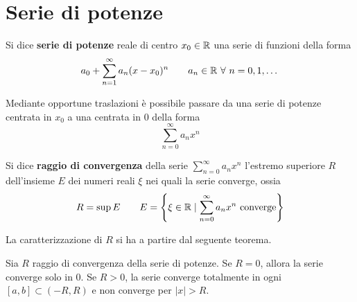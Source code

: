 \section{Serie di potenze}
\begin{definition}
Si dice \textbf{serie di potenze} reale di centro $x_0 \in \mathbb{R}$ una serie di funzioni della forma
\begin{equation*}
    a_0+ \sum_{n=1}^{\infty}{a_n(x-x_0)^n} \qquad a_n \in \R\ \forall\ n=0,1,\dots
\end{equation*}
\end{definition}
\begin{oss}
    Mediante opportune traslazioni è possibile passare da una serie di potenze centrata in $x_0$ a una centrata in $0$ della forma
    \begin{equation*}
        \sum_{n=0}^{\infty}{a_n x^n}
    \end{equation*}
\end{oss}
\begin{definition}
    Si dice \textbf{raggio di convergenza} della serie $\sum\limits_{n=0}^{\infty}{a_n x^n}$ l'estremo superiore $R$ dell'insieme $E$ dei numeri reali $\xi$ nei quali la serie converge, ossia
    \begin{equation*}
        R= \sup E \qquad E=\left\{ \xi \in \R \mid \sum_{n=0}^{\infty}{a_n x^n}\ \text{converge}\right\}
    \end{equation*}
\end{definition}
La caratterizzazione di $R$ si ha a partire dal seguente teorema.
\begin{theorem} \label{Teo: Caratterizzazione del raggio di convergenza}
    Sia $R$ raggio di convergenza della serie di potenze. Se $R=0$, allora la serie converge solo in $0$. Se $R>0$, la serie converge totalmente in ogni $[a,b] \subset (-R, R)$ e non converge per $|x|>R$.
\end{theorem}
